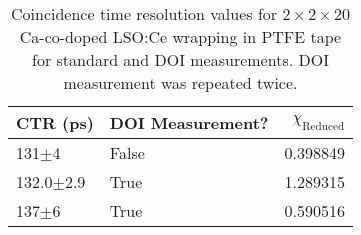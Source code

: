 \begin{table}
\caption{\label{tab:referencevals} Coincidence time resolution values for $2\times2\times20$ Ca-co-doped LSO:Ce wrapping in PTFE tape for standard and DOI measurements. DOI measurement was repeated twice.}
\begin{tabular}{llr}
\hline
       CTR (ps) &    DOI Measurement? &  $\chi_\text{Reduced}$ \\
\hline
     131$\pm$4 &  False &    0.398849 \\
 132.0$\pm$2.9 &   True &    1.289315 \\
     137$\pm$6 &   True &    0.590516 \\
\hline
\end{tabular}
\end{table}